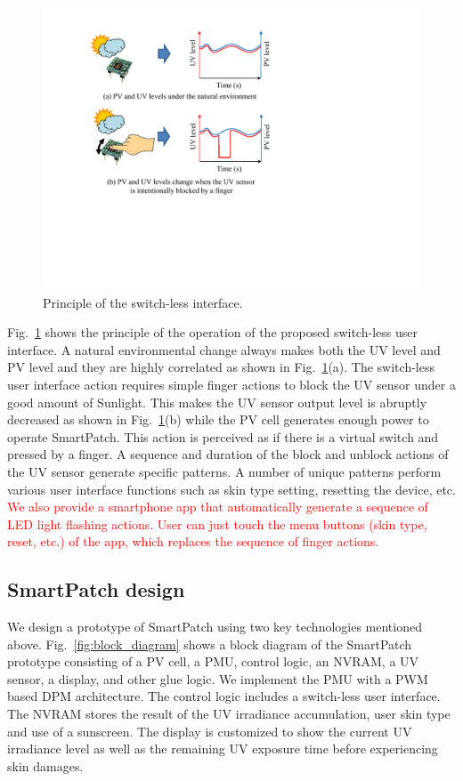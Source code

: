 \documentclass[journal]{IEEEtran}
\begin{document}
\begin{figure}
\centering
\includegraphics[width=0.8\hsize]{Figures/switchless_interface.pdf}
\caption{Principle of the switch-less interface.}
\label{fig:switchless_interface}
\end{figure}

Fig.~\ref{fig:switchless_interface} shows the principle of the operation of the proposed switch-less user interface. A natural environmental change always makes both the UV level and PV level and they are highly correlated as shown in Fig.~\ref{fig:switchless_interface}(a). The switch-less user interface action requires simple finger actions to block the UV sensor under a good amount of Sunlight. This makes the UV sensor output level is abruptly decreased as shown in Fig.~\ref{fig:switchless_interface}(b) while the PV cell generates enough power to operate SmartPatch. This action is perceived as if there is a virtual switch and pressed by a finger. A sequence and duration of the block and unblock actions of the UV sensor generate specific patterns. A number of unique patterns perform various user interface functions such as skin type setting, resetting the device, etc. \textcolor{red}{We also provide a smartphone app that automatically generate a sequence of LED light flashing actions. User can just touch the  menu buttons (skin type, reset, etc.) of the app,  which replaces the sequence of finger actions.}

\subsection{SmartPatch design}

We design a prototype of SmartPatch using two key technologies mentioned above.
Fig.~\ref{fig:block_diagram} shows a block diagram of the SmartPatch prototype consisting of a PV cell, a PMU, control logic, an NVRAM, a UV sensor, a display, and other glue logic. We implement the PMU with a PWM based DPM architecture. The control logic includes a switch-less user interface. The NVRAM stores the result of the UV irradiance accumulation, user skin type and use of a sunscreen. The display is customized to show the current UV irradiance level as well as the remaining UV exposure time before experiencing skin damages.
\end{document}
